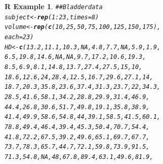 \documentclass{article}\usepackage[]{graphicx}\usepackage[]{color}
\makeatletter
\newcommand{\hlnum}[1]{\textcolor[rgb]{0.686,0.059,0.569}{#1}}%
\newcommand{\hlcom}[1]{\textcolor[rgb]{0.678,0.584,0.686}{\textit{#1}}}%
\newcommand{\hlopt}[1]{\textcolor[rgb]{0,0,0}{#1}}%
\newcommand{\hlstd}[1]{\textcolor[rgb]{0.345,0.345,0.345}{#1}}%
\newcommand{\hlkwb}[1]{\textcolor[rgb]{0.69,0.353,0.396}{#1}}%
\newcommand{\hlkwc}[1]{\textcolor[rgb]{0.333,0.667,0.333}{#1}}%
\newcommand{\hlkwd}[1]{\textcolor[rgb]{0.737,0.353,0.396}{\textbf{#1}}}%
\newenvironment{kframe}{%
 \def\at@end@of@kframe{}%
 \ifinner\ifhmode%
  \def\at@end@of@kframe{\end{minipage}}%
  \begin{minipage}{\columnwidth}%
 \fi\fi%
 \def\FrameCommand##1{\hskip\@totalleftmargin \hskip-\fboxsep
 \colorbox{shadecolor}{##1}\hskip-\fboxsep
     \hskip-\linewidth \hskip-\@totalleftmargin \hskip\columnwidth}%
 \MakeFramed {\advance\hsize-\width
   \@totalleftmargin\z@ \linewidth\hsize
   \@setminipage}}%
 {\par\unskip\endMakeFramed%
 \at@end@of@kframe}
\newenvironment{knitrout}{}{} %
\newtheorem{rexample}{R Example}%
\makeatother
\begin{document}
\begin{knitrout}
\begin{kframe}
\begin{rexample}
\begin{alltt}
\hlcom{## Bladder data}
\hlstd{subject} \hlkwb{<-} \hlkwd{rep}\hlstd{(}\hlnum{1}\hlopt{:}\hlnum{23}\hlstd{,} \hlkwc{times} \hlstd{=} \hlnum{8}\hlstd{)}
\hlstd{volume} \hlkwb{<-} \hlkwd{rep}\hlstd{(}\hlkwd{c}\hlstd{(}\hlnum{10}\hlstd{,} \hlnum{25}\hlstd{,} \hlnum{50}\hlstd{,} \hlnum{75}\hlstd{,} \hlnum{100}\hlstd{,} \hlnum{125}\hlstd{,} \hlnum{150}\hlstd{,} \hlnum{175}\hlstd{),}
    \hlkwc{each} \hlstd{=} \hlnum{23}\hlstd{)}
\hlstd{HD} \hlkwb{<-} \hlkwd{c}\hlstd{(}\hlnum{13.2}\hlstd{,} \hlnum{11.1}\hlstd{,} \hlnum{10.3}\hlstd{,} \hlnum{NA}\hlstd{,} \hlnum{4.8}\hlstd{,} \hlnum{7.7}\hlstd{,} \hlnum{NA}\hlstd{,} \hlnum{5.9}\hlstd{,} \hlnum{1.9}\hlstd{,}
    \hlnum{6.5}\hlstd{,} \hlnum{19.8}\hlstd{,} \hlnum{14.6}\hlstd{,} \hlnum{NA}\hlstd{,} \hlnum{NA}\hlstd{,} \hlnum{9.7}\hlstd{,} \hlnum{17.2}\hlstd{,} \hlnum{10.6}\hlstd{,} \hlnum{19.3}\hlstd{,}
    \hlnum{8.5}\hlstd{,} \hlnum{6.9}\hlstd{,} \hlnum{8.1}\hlstd{,} \hlnum{14.8}\hlstd{,} \hlnum{13.7}\hlstd{,} \hlnum{27.4}\hlstd{,} \hlnum{27.5}\hlstd{,} \hlnum{15}\hlstd{,} \hlnum{10}\hlstd{,}
    \hlnum{18.6}\hlstd{,} \hlnum{12.6}\hlstd{,} \hlnum{24}\hlstd{,} \hlnum{28.4}\hlstd{,} \hlnum{12.5}\hlstd{,} \hlnum{16.7}\hlstd{,} \hlnum{29.6}\hlstd{,} \hlnum{27.1}\hlstd{,} \hlnum{14}\hlstd{,}
    \hlnum{18.7}\hlstd{,} \hlnum{20.3}\hlstd{,} \hlnum{35.8}\hlstd{,} \hlnum{23.6}\hlstd{,} \hlnum{37.4}\hlstd{,} \hlnum{31.3}\hlstd{,} \hlnum{23.7}\hlstd{,} \hlnum{22}\hlstd{,} \hlnum{34.3}\hlstd{,}
    \hlnum{28.5}\hlstd{,} \hlnum{41.6}\hlstd{,} \hlnum{58.1}\hlstd{,} \hlnum{34.2}\hlstd{,} \hlnum{28.8}\hlstd{,} \hlnum{29.9}\hlstd{,} \hlnum{31.4}\hlstd{,} \hlnum{46.9}\hlstd{,}
    \hlnum{44.4}\hlstd{,} \hlnum{26.8}\hlstd{,} \hlnum{30.6}\hlstd{,} \hlnum{51.7}\hlstd{,} \hlnum{49.8}\hlstd{,} \hlnum{19.1}\hlstd{,} \hlnum{35.8}\hlstd{,} \hlnum{38.9}\hlstd{,}
    \hlnum{41.4}\hlstd{,} \hlnum{49.9}\hlstd{,} \hlnum{58.6}\hlstd{,} \hlnum{54.8}\hlstd{,} \hlnum{44}\hlstd{,} \hlnum{39.1}\hlstd{,} \hlnum{58.5}\hlstd{,} \hlnum{41.5}\hlstd{,} \hlnum{60.1}\hlstd{,}
    \hlnum{78.8}\hlstd{,} \hlnum{49.4}\hlstd{,} \hlnum{46.4}\hlstd{,} \hlnum{39.4}\hlstd{,} \hlnum{45.3}\hlstd{,} \hlnum{50.4}\hlstd{,} \hlnum{70.7}\hlstd{,} \hlnum{54.4}\hlstd{,}
    \hlnum{41.8}\hlstd{,} \hlnum{72.2}\hlstd{,} \hlnum{67.5}\hlstd{,} \hlnum{39.2}\hlstd{,} \hlnum{49.6}\hlstd{,} \hlnum{65.1}\hlstd{,} \hlnum{69.7}\hlstd{,} \hlnum{67.7}\hlstd{,}
    \hlnum{73.7}\hlstd{,} \hlnum{78.3}\hlstd{,} \hlnum{65.7}\hlstd{,} \hlnum{44.7}\hlstd{,} \hlnum{72.1}\hlstd{,} \hlnum{59.8}\hlstd{,} \hlnum{73.9}\hlstd{,} \hlnum{91.5}\hlstd{,}
    \hlnum{71.3}\hlstd{,} \hlnum{54.8}\hlstd{,} \hlnum{NA}\hlstd{,} \hlnum{48}\hlstd{,} \hlnum{67.8}\hlstd{,} \hlnum{89.4}\hlstd{,} \hlnum{63.1}\hlstd{,} \hlnum{49.6}\hlstd{,} \hlnum{81.9}\hlstd{,}

\end{alltt}
\end{rexample}
\end{kframe}
\end{knitrout}
\end{document}
